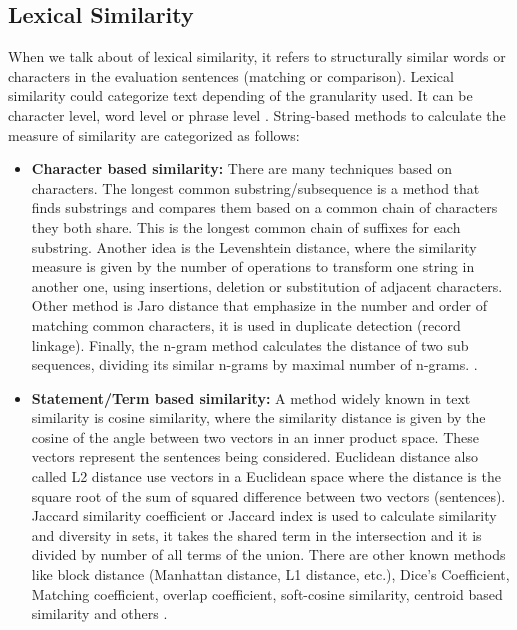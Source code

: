 \documentclass[12pt]{report}
\begin{document}
\subsection{Lexical Similarity}
When we talk about of lexical similarity, it refers to structurally similar words or characters in the evaluation sentences (matching or comparison). 
Lexical similarity could categorize text depending of the granularity used. It can be character level, word level or phrase level \cite{Ganesan2015} \cite{Pradhan2015}. String-based methods to calculate the measure of similarity are categorized as follows:

\begin{itemize}[nolistsep]
	\item \textbf{Character based similarity:} There are many techniques  based on characters. The longest common substring/subsequence is a method that finds substrings and compares them based on a common chain of characters they both share. This is the longest common chain of suffixes for each substring. Another idea is the Levenshtein distance, where the similarity measure is given by the number of operations to transform one string in another one, using insertions, deletion or substitution of adjacent characters. Other method is Jaro distance that emphasize in the number and order of matching common characters, it is used in duplicate detection (record linkage). Finally, the n-gram method  calculates the distance of two sub sequences, dividing its similar n-grams by maximal number of n-grams. \cite{Gomaa2013} \cite{Majumder2016} \cite{Pradhan2015}.
	\item \textbf{Statement/Term based similarity:} A method widely known in text similarity is cosine similarity, where the similarity distance is given by the cosine of the angle between two vectors in an inner product space. These vectors represent the sentences being considered. Euclidean distance also called L2 distance use vectors in a Euclidean space where the distance is the square root of the sum of squared difference between two vectors (sentences). Jaccard similarity coefficient or Jaccard index is used to calculate similarity and diversity in sets, it takes the shared term in the intersection and it is divided by number of all terms of the union. There are other known methods like block distance (Manhattan distance, L1 distance, etc.), Dice's Coefficient, Matching coefficient, overlap coefficient, soft-cosine similarity, centroid based similarity and others\cite{Majumder2016} \cite{Pradhan2015} \cite{Gomaa2013} .
\end{itemize}
\end{document}
